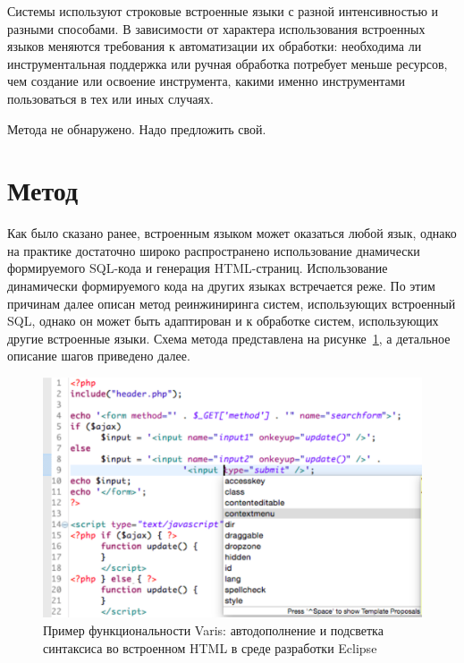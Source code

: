 Системы используют строковые встроенные языки с разной интенсивностью и разными способами. В зависимости от характера использования встроенных языков меняются требования к автоматизации их обработки: необходима ли инструментальная поддержка или ручная обработка потребует меньше ресурсов, чем создание или освоение инструмента, какими именно инструментами пользоваться в тех или иных случаях.

Метода не обнаружено. Надо предложить свой.


\section{Метод}

Как было сказано ранее, встроенным языком может оказаться любой язык, однако на практике достаточно широко распространено использование днамически формируемого SQL-кода и генерация HTML-страниц. Использование динамически формируемого кода на других языках встречается реже. По этим причинам далее описан метод реинжиниринга систем, использующих встроенный SQL, однако он может быть адаптирован и к обработке систем, использующих другие встроенные языки. Схема метода представлена на рисунке~\ref{fig:method}, а детальное описание шагов приведено далее.

\begin{figure}[h!]
\begin{center}
\includegraphics[width=.9\textwidth]{pics/Varis.pdf}
\caption{Пример функциональности Varis: автодополнение и подсветка синтаксиса во встроенном HTML в среде разработки Eclipse}
\label{fig:method} 
\end{center}
\end{figure}


